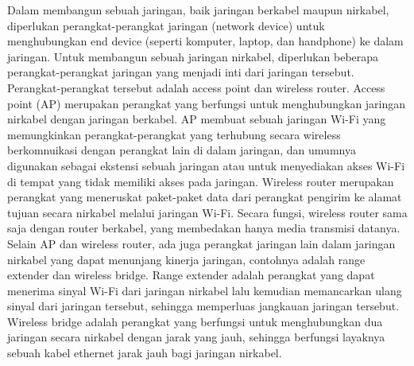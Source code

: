 Dalam membangun sebuah jaringan, baik jaringan berkabel maupun nirkabel, diperlukan perangkat-perangkat jaringan (network device) untuk menghubungkan end device (seperti komputer, laptop, dan handphone) ke dalam jaringan. Untuk membangun sebuah jaringan nirkabel, diperlukan beberapa perangkat-perangkat jaringan yang menjadi inti dari jaringan tersebut. Perangkat-perangkat tersebut adalah access point dan wireless router. Access point (AP) merupakan perangkat yang berfungsi untuk menghubungkan jaringan nirkabel dengan jaringan berkabel. AP membuat sebuah jaringan Wi-Fi yang memungkinkan perangkat-perangkat yang terhubung secara wireless berkomnuikasi dengan perangkat lain di dalam jaringan, dan umumnya digunakan sebagai ekstensi sebuah jaringan atau untuk menyediakan akses Wi-Fi di tempat yang tidak memiliki akses pada jaringan. Wireless router merupakan perangkat yang meneruskat paket-paket data dari perangkat pengirim ke alamat tujuan secara nirkabel melalui jaringan Wi-Fi. Secara fungsi, wireless router sama saja dengan router berkabel, yang membedakan hanya media transmisi datanya. Selain AP dan wireless router, ada juga perangkat jaringan lain dalam jaringan nirkabel yang dapat menunjang kinerja jaringan, contohnya adalah range extender dan wireless bridge. Range extender adalah perangkat yang dapat menerima sinyal Wi-Fi dari jaringan nirkabel lalu kemudian memancarkan ulang sinyal dari jaringan tersebut, sehingga memperluas jangkauan jaringan tersebut. Wireless bridge adalah perangkat yang berfungsi untuk menghubungkan dua jaringan secara nirkabel dengan jarak yang jauh, sehingga berfungsi layaknya sebuah kabel ethernet jarak jauh bagi jaringan nirkabel.

